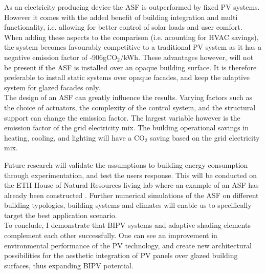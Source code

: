 

As an electricity producing device the ASF is outperformed by fixed PV systems. However it comes with the added benefit of building integration and multi functionality, i.e. allowing for better control of solar loads and user comfort. When adding these aspects to the comparison (i.e. acounting for HVAC savings), the system becomes favourably competitive to a traditional PV system as it has a negative emission factor of -906gCO${_2}$/kWh. These advantages however, will not be present if the ASF is installed over an opaque building surface. It is therefore preferable to install static systems over opaque facades, and keep the adaptive system for glazed facades only.\\

The design of an ASF can greatly influence the results. Varying factors such as the choice of actuators, the complexity of the control system, and the structural support can change the emission factor. The largest variable however is the emission factor of the grid electricity mix. The building operational savings in heating, cooling, and lighting will have a CO${_2}$ saving based on the grid electricity mix. 


Future research will validate the assumptions to building energy consumption through experimentation, and test the users response. This will be conducted on the ETH House of Natural Resources living lab where an example of an ASF has already been constructed \cite{nagy2016adaptive}. Further numerical simulations of the ASF on different building typologies, building systems and climates will enable us to specifically target the best application scenario. \\

To conclude, I demonstrate that BIPV systems and adaptive shading elements complement each other successfully. One can see an improvement in environmental performance of the PV technology, and create new architectural possibilities for the aesthetic integration of PV panels over glazed building surfaces, thus expanding BIPV potential. 

